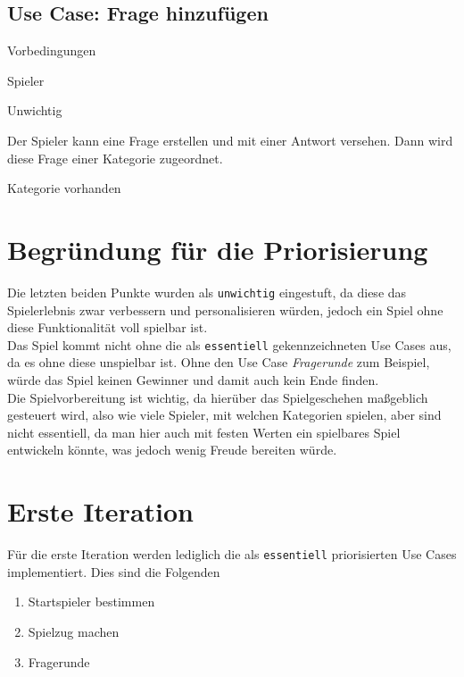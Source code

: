 \subsection{Use Case: Frage hinzufügen}
\begin{labeling}[:]{Vorbedingungen}
\item [Akteure] Spieler
\item [Priorität] Unwichtig
\item [Beschreibung] Der Spieler kann eine Frage erstellen und mit einer Antwort versehen. Dann wird diese Frage einer Kategorie zugeordnet.
\item [Vorbedingungen] Kategorie vorhanden
\item [Offene Punkte]
\end{labeling}

\section{Begründung für die Priorisierung}\label{sec:begruendung-prio}
Die letzten beiden Punkte wurden als \texttt{unwichtig} eingestuft, da diese das Spielerlebnis zwar verbessern und personalisieren würden, jedoch ein Spiel ohne diese Funktionalität voll spielbar ist.\\
Das Spiel kommt nicht ohne die als \texttt{essentiell} gekennzeichneten Use Cases aus, da es ohne diese unspielbar ist. Ohne den Use Case \emph{Fragerunde} zum Beispiel, würde das Spiel keinen Gewinner und damit auch kein Ende finden.\\
Die Spielvorbereitung ist wichtig, da hierüber das Spielgeschehen maßgeblich gesteuert wird, also wie viele Spieler, mit welchen Kategorien spielen, aber sind nicht essentiell, da man hier auch mit festen Werten ein spielbares Spiel entwickeln könnte, was jedoch wenig Freude bereiten würde.

\newpage
\section{Erste Iteration}
Für die erste Iteration werden lediglich die als \texttt{essentiell} priorisierten Use Cases implementiert. Dies sind die Folgenden

\begin{enumerate}
\item Startspieler bestimmen
\item Spielzug machen
\item Fragerunde
\end{enumerate}

